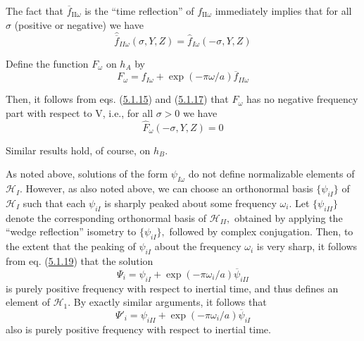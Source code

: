 \documentclass[11pt,a4paper]{article}
\begin{document}
The fact that \(\overline{f}_{\mathrm{II}\omega}\) is the ``time reflection'' of \(f_{\mathrm{II}\omega}\) immediately implies that for all \(\sigma\) (positive or negative) we have
\begin{equation*}
\hat{\overline{f}}_{II\omega}(\sigma,Y,Z) = \hat{f}_{I\omega}(-\sigma,Y,Z) \tag{5.1.17}\label{eq:5.1.17}
\end{equation*}

Define the function \(F_{\omega}\) on \(h_A\) by
\begin{equation*}
F_{\omega} = f_{I\omega} + \exp(-\pi \omega/a) \overline{f}_{II\omega} \tag{5.1.18}\label{eq:5.1.18}
\end{equation*}

Then, it follows from eqs. (\hyperref[eq:5.1.15]{5.1.15}) and (\hyperref[eq:5.1.17]{5.1.17}) that \(F_{\omega}\) has no negative frequency part with respect to V, i.e., for all \(\sigma > 0\) we have
\begin{equation*}
\hat{F}_{\omega}(-\sigma, Y, Z) = 0 \tag{5.1.19}\label{eq:5.1.19}
\end{equation*}

Similar results hold, of course, on \(h_B\).

As noted above, solutions of the form \(\psi_{I\omega}\) do not define normalizable elements of \(\mathcal{H}_I.\) However, as also noted above, we can choose an orthonormal basis \(\{\psi_{iI}\}\) of \(\mathcal{H}_I\) such that each \(\psi_{iI}\) is sharply peaked about some frequency \(\omega_i.\) Let \(\{\psi_{iII}\}\) denote the corresponding orthonormal basis of \(\mathcal{H}_{II},\) obtained by applying the ``wedge reflection'' isometry to \(\{\psi_{iI}\},\) followed by complex conjugation. Then, to the extent that the peaking of \(\psi_{iI}\) about the frequency \(\omega_i\) is very sharp, it follows from eq. (\hyperref[eq:5.1.19]{5.1.19}) that the solution
\begin{equation*}
\Psi_{i} = \psi_{iI} + \exp(-\pi\omega_{i}/a) \overline{\psi}_{iII} \tag{5.1.20}\label{eq:5.1.20}
\end{equation*}
is purely positive frequency with respect to inertial time, and thus defines an element of \(\mathcal{H}_1\). By exactly similar arguments, it follows that
\begin{equation*}
\Psi'_{i} = \psi_{iII} + \exp(-\pi\omega_{i}/a) \overline{\psi}_{iI} \tag{5.1.21}\label{eq:5.1.21}
\end{equation*} \hypertarget{source-127}{} also is purely positive frequency with respect to inertial time.
\end{document}
